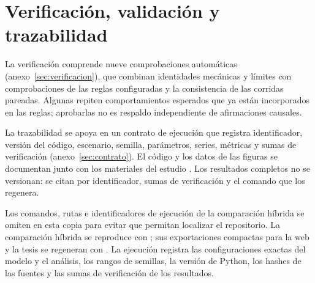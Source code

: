 \section{Verificación, validación y trazabilidad}

La verificación comprende nueve comprobaciones automáticas (anexo~\ref{sec:verificacion}), que combinan identidades mecánicas y límites con comprobaciones de las reglas configuradas y la consistencia de las corridas pareadas. Algunas repiten comportamientos esperados que ya están incorporados en las reglas; aprobarlas no es respaldo independiente de afirmaciones causales.

La trazabilidad se apoya en un contrato de ejecución que registra identificador, versión del código, escenario, semilla, parámetros, series, métricas y sumas de verificación (anexo~\ref{sec:contrato}). El código y los datos de las figuras se documentan junto con los materiales del estudio \cite{calderon2026repository}. Los resultados completos no se versionan: se citan por identificador, sumas de verificación y el comando que los regenera.

\ifdefined\blindreviewmode
Los comandos, rutas e identificadores de ejecución de la comparación híbrida se omiten en esta copia para evitar que permitan localizar el repositorio.
\else
La comparación híbrida se reproduce con ; sus exportaciones compactas para la web y la tesis se regeneran con . La ejecución \code{\HybridRunID} registra las configuraciones exactas del modelo y el análisis, los rangos de semillas, la versión de Python, los hashes de las fuentes y las sumas de verificación de los resultados.
\fi
